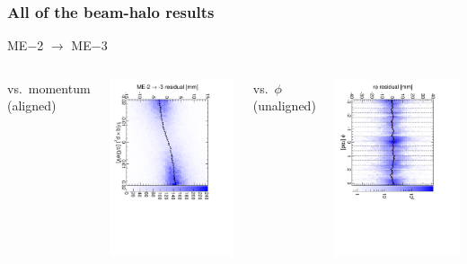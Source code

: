 \documentclass[compress]{beamer}
\begin{document}
\begin{frame}
\frametitle{All of the beam-halo results}

\begin{center}
ME$-$2 $\to$ ME$-$3
\end{center}

\begin{columns}
\centering vs.\ momentum (aligned)

\includegraphics[height=\linewidth, angle=90]{linear_mem2to3.pdf}

\centering vs.\ $\phi$ (unaligned)

\includegraphics[height=\linewidth, angle=90]{diskiter01_m2to3.pdf}


\end{columns}
\end{frame}
\end{document}
